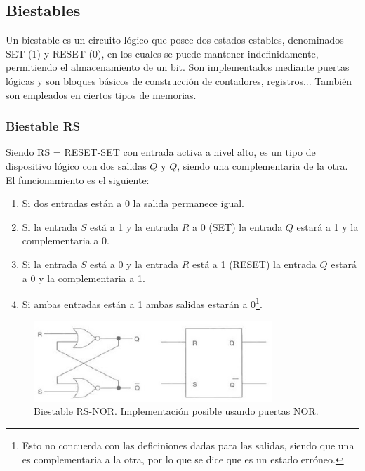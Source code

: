 \documentclass[a4paper, 11pt, titlepage]{article}
\begin{document}
	\subsection{Biestables}

		Un biestable es un circuito lógico que posee dos estados estables, denominados SET (1) y RESET (0), en 
		los cuales se puede mantener indefinidamente, permitiendo el almacenamiento de un bit. Son implementados 
		mediante puertas lógicas y son bloques básicos de construcción de contadores, registros... También 
		son empleados en ciertos tipos de memorias.

		\subsubsection{Biestable RS}\label{biestablers}

			Siendo RS = RESET-SET con entrada activa a nivel alto, es un tipo de dispositivo lógico con 
			dos salidas $Q$ y $\overline{Q}$, siendo una complementaria de la otra. El funcionamiento es el 
			siguiente:

			\begin{enumerate}
				\item Si dos entradas están a 0 la salida permanece igual.
				\item Si la entrada $S$ está a 1 y la entrada $R$ a 0 (SET) la entrada $Q$ 
				estará a 1 y la complementaria a 0.
				\item Si la entrada $S$ está a 0 y la entrada $R$ está a 1 (RESET) la entrada 
				$Q$ estará a 0 y la complementaria a 1.
				\item Si ambas entradas están a 1 ambas salidas estarán a 0\footnote{
					Esto no concuerda con las deficiniones dadas para las salidas, siendo que una 
					es complementaria a la otra, por lo que se dice que es un estado erróneo.
				}.
			\end{enumerate}

			\begin{figure}[htp]
				\centering
				\includegraphics[width=0.8\textwidth]{resources/biestablesrsnor.jpg}
				\caption{Biestable RS-NOR. Implementación posible usando puertas NOR.}
				\label{biestablesrsnor}
			\end{figure}
	
\end{document}
